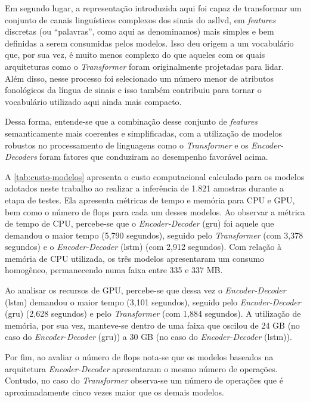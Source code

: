 Em segundo lugar, a representação introduzida aqui foi capaz de transformar um conjunto de canais linguísticos complexos dos sinais do \acrshort{asllvd}, em \textit{features} discretas (ou ``palavras'', como aqui as denominamos) mais simples e bem definidas a serem consumidas pelos modelos.
Isso deu origem a um vocabulário que, por sua vez, é muito menos complexo do que aqueles com os quais arquiteturas como o \textit{Transformer} foram originalmente projetadas para lidar. Além disso, nesse processo foi selecionado um número menor de atributos fonológicos da língua de sinais e isso também contribuiu para tornar o vocabulário utilizado aqui ainda mais compacto.

Dessa forma, entende-se que a combinação desse conjunto de \textit{features} semanticamente mais coerentes e simplificadas, com a utilização de modelos robustos no processamento de linguagens como o \textit{Transformer} e os \textit{Encoder-Decoders} foram fatores que conduziram ao desempenho favorável acima.






A \autoref{tab:custo-modelos} apresenta o custo computacional calculado para os modelos adotados neste trabalho ao realizar a inferência de 1.821 amostras durante a etapa de testes. Ela apresenta métricas de tempo e memória para CPU e GPU, bem como o número de \acrfull{flops} para cada um desses modelos.
Ao observar a métrica de tempo de CPU, percebe-se que o \textit{Encoder-Decoder} (\acrshort{gru}) foi aquele que demandou o maior tempo (5,790 segundos), seguido pelo \textit{Transformer} (com 3,378 segundos) e o \textit{Encoder-Decoder} (\acrshort{lstm}) (com 2,912 segundos). 
Com relação à memória de CPU utilizada, os três modelos apresentaram um consumo homogêneo, permanecendo numa faixa entre 335 e 337 MB.



Ao analisar os recursos de GPU, percebe-se que dessa vez o \textit{Encoder-Decoder} (\acrshort{lstm}) demandou o maior tempo (3,101 segundos), seguido pelo \textit{Encoder-Decoder} (\acrshort{gru}) (2,628 segundos) e pelo \textit{Transformer} (com 1,884 segundos). A utilização de memória, por sua vez, manteve-se dentro de uma faixa que oscilou de 24 GB (no caso do \textit{Encoder-Decoder} (\acrshort{gru})) a 30 GB (no caso do \textit{Encoder-Decoder} (\acrshort{lstm})).

Por fim, ao avaliar o número de \acrshort{flops} nota-se que os modelos baseados na arquitetura \textit{Encoder-Decoder} apresentaram o mesmo número de operações. Contudo, no caso do \textit{Transformer} observa-se um número de operações que é aproximadamente cinco vezes maior que os demais modelos.
